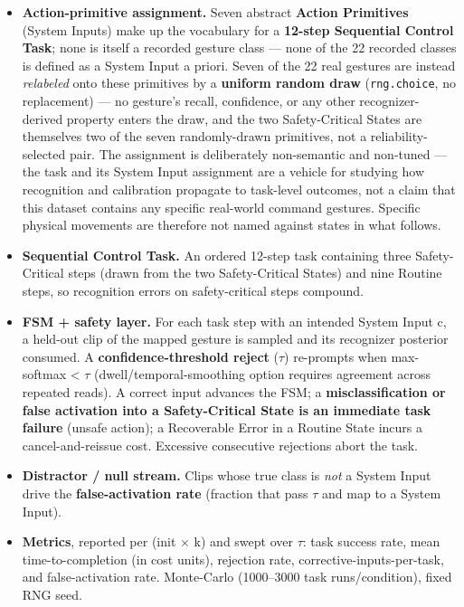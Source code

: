 \begin{itemize}
  \item \textbf{Action-primitive assignment.} Seven abstract \textbf{Action Primitives} (System Inputs) make up the vocabulary for a \textbf{12-step Sequential Control Task}; none is itself a recorded gesture class --- none of the 22 recorded classes is defined as a System Input a priori. Seven of the 22 real gestures are instead \textit{relabeled} onto these primitives by a \textbf{uniform random draw} (\texttt{rng.choice}, no replacement) --- no gesture's recall, confidence, or any other recognizer-derived property enters the draw, and the two Safety-Critical States are themselves two of the seven randomly-drawn primitives, not a reliability-selected pair. The assignment is deliberately non-semantic and non-tuned --- the task and its System Input assignment are a vehicle for studying how recognition and calibration propagate to task-level outcomes, not a claim that this dataset contains any specific real-world command gestures. Specific physical movements are therefore not named against states in what follows.
  \item \textbf{Sequential Control Task.} An ordered 12-step task containing three Safety-Critical steps (drawn from the two Safety-Critical States) and nine Routine steps, so recognition errors on safety-critical steps compound.
  \item \textbf{FSM + safety layer.} For each task step with an intended System Input c, a held-out clip of the mapped gesture is sampled and its recognizer posterior consumed. A \textbf{confidence-threshold reject} ($\tau$) re-prompts when max-softmax < $\tau$ (dwell/temporal-smoothing option requires agreement across repeated reads). A correct input advances the FSM; a \textbf{misclassification or false activation into a Safety-Critical State is an immediate task failure} (unsafe action); a Recoverable Error in a Routine State incurs a cancel-and-reissue cost. Excessive consecutive rejections abort the task.
  \item \textbf{Distractor / null stream.} Clips whose true class is \textit{not} a System Input drive the \textbf{false-activation rate} (fraction that pass $\tau$ and map to a System Input).
  \item \textbf{Metrics}, reported per (init $\times$ k) and swept over $\tau$: task success rate, mean time-to-completion (in cost units), rejection rate, corrective-inputs-per-task, and false-activation rate. Monte-Carlo (1000--3000 task runs/condition), fixed RNG seed.
\end{itemize}

